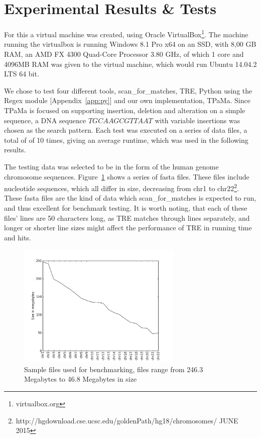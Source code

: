 \section{Experimental Results \& Tests}
For this a virtual machine was created, using Oracle VirtualBox\footnote{virtualbox.org}. The machine running the virtualbox is running Windows 8.1 Pro x64 on an SSD, with 8,00 GB RAM, an AMD FX 4300 Quad-Core Processor 3.80 GHz, of which 1 core and 4096MB RAM was given to the virtual machine, which would run Ubuntu 14.04.2 LTS 64 bit.

We chose to test four different tools, scan\_for\_matches, TRE, Python using the Regex module [Appendix~\ref{app:py}] and our own implementation, TPaMa. Since TPaMa is focused on supporting insertion, deletion and alteration on a simple sequence, a DNA sequence $TGCAAGCGTTAAT$ with variable insertions was chosen as the search pattern. Each test was executed on a series of data files, a total of of 10 times, giving an average runtime, which was used in the following results.


The testing data was selected to be in the form of the human genome chromosome sequences. Figure~\ref{fig:size} shows a series of fasta files. These files include nucleotide sequences, which all differ in size, decreasing from chr1 to chr22\footnote{http://hgdownload.cse.ucsc.edu/goldenPath/hg18/chromosomes/ JUNE 2015}. These fasta files are the kind of data which scan\_for\_matches is expected to run, and thus excellent for benchmark testing. It is worth noting, that each of these files' lines are 50 characters long, as TRE matches through lines separately, and longer or shorter line sizes might affect the performance of TRE in running time and hits.%
\newpage
\begin{figure}[h!]
\centering
\includegraphics[width=0.7\textwidth]{Benchmarking/size.png}
\caption{Sample files used for benchmarking, files range from 246.3 Megabytes to 46.8 Megabytes in size}
\label{fig:size}
\end{figure}


